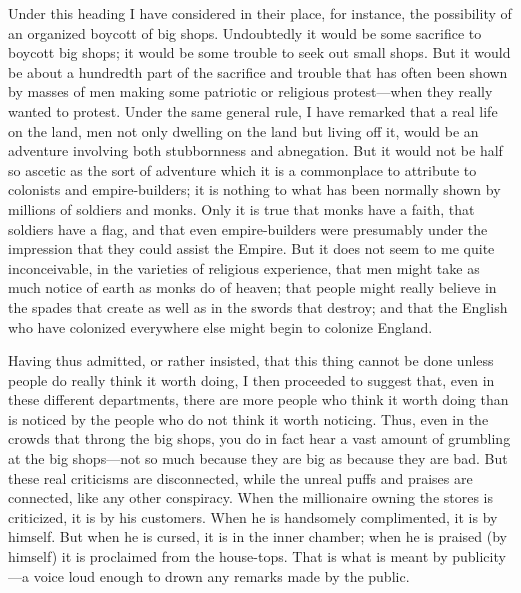 \documentclass{book}
\begin{document}
Under this heading I have considered in their place, for instance, the possibility of an organized boycott of big shops. Undoubtedly it would be some sacrifice to boycott big shops; it would be some trouble to seek out small shops. But it would be about a hundredth part of the sacrifice and trouble that has often been shown by masses of men making some patriotic or religious protest—when they really wanted to protest. Under the same general rule, I have remarked that a real life on the land, men not only dwelling on the land but living off it, would be an adventure involving both stubbornness and abnegation. But it would not be half so ascetic as the sort of adventure which it is a commonplace to attribute to colonists and empire-builders; it is nothing to what has been normally shown by millions of soldiers and monks. Only it is true that monks have a faith, that soldiers have a flag, and that even empire-builders were presumably under the impression that they could assist the Empire. But it does not seem to me quite inconceivable, in the varieties of religious experience, that men might take as much notice of earth as monks do of heaven; that people might really believe in the spades that create as well as in the swords that destroy; and that the English who have colonized everywhere else might begin to colonize England.

Having thus admitted, or rather insisted, that this thing cannot be done unless people do really think it worth doing, I then proceeded to suggest that, even in these different departments, there are more people who think it worth doing than is noticed by the people who do not think it worth noticing. Thus, even in the crowds that throng the big shops, you do in fact hear a vast amount of grumbling at the big shops—not so much because they are big as because they are bad. But these real criticisms are disconnected, while the unreal puffs and praises are connected, like any other conspiracy. When the millionaire owning the stores is criticized, it is by his customers. When he is handsomely complimented, it is by himself. But when he is cursed, it is in the inner chamber; when he is praised (by himself) it is proclaimed from the house-tops. That is what is meant by publicity—a voice loud enough to drown any remarks made by the public.
\end{document}
